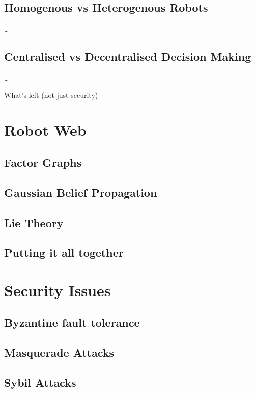 \subsection{Homogenous vs Heterogenous Robots}
\dots

\subsection{Centralised vs Decentralised Decision Making}
\dots

What's left (not just security)


\section{Robot Web}

\subsection{Factor Graphs}
\subsection{Gaussian Belief Propagation}
\subsection{Lie Theory}
\subsection{Putting it all together}

\section{Security Issues}
\subsection{Byzantine fault tolerance}
\subsection{Masquerade Attacks}
\subsection{Sybil Attacks}

